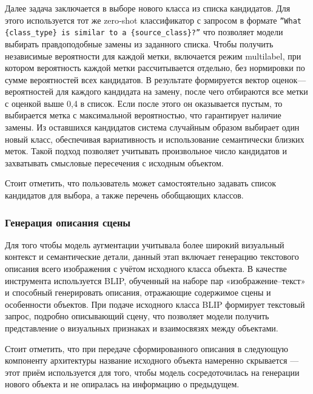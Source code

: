 Далее задача заключается в выборе нового класса из списка кандидатов. Для этого используется тот же zero‐shot классификатор с запросом в формате
\texttt{''What \{class\_type\} is similar to a \{source\_class\}?''}
что позволяет модели выбирать правдоподобные замены из заданного списка. Чтобы получить независимые вероятности для каждой метки, включается режим multilabel, при котором вероятность каждой метки рассчитывается отдельно, без нормировки по сумме вероятностей всех кандидатов. В результате формируется вектор оценок—вероятностей для каждого кандидата на замену, после чего отбираются все метки с оценкой выше 0,4 в список. Если после этого он оказывается пустым, то выбирается метка с максимальной вероятностью, что гарантирует наличие замены. Из оставшихся кандидатов система случайным образом выбирает один новый класс, обеспечивая вариативность и использование семантически близких меток. Такой подход позволяет учитывать произвольное число кандидатов и захватывать смысловые пересечения с исходным объектом.

Стоит отметить, что пользователь может самостоятельно задавать список кандидатов для выбора, а также перечень обобщающих классов.

\subsubsection{Генерация описания сцены}
Для того чтобы модель аугментации учитывала более широкий визуальный контекст и семантические детали, данный этап включает генерацию текстового описания всего изображения с учётом исходного класса объекта. В качестве инструмента используется BLIP\cite{DBLP:journals/corr/abs-2201-12086}, обученный на наборе пар «изображение–текст» и способный генерировать описания, отражающие содержимое сцены и особенности объектов. При подаче исходного класса BLIP формирует текстовый запрос, подробно описывающий сцену, что позволяет модели получить представление о визуальных признаках и взаимосвязях между объектами.

Стоит отметить, что при передаче сформированного описания в следующую компоненту архитектуры название исходного объекта намеренно скрывается — этот приём используется для того, чтобы модель сосредоточилась на генерации нового объекта и не опиралась на информацию о предыдущем.

